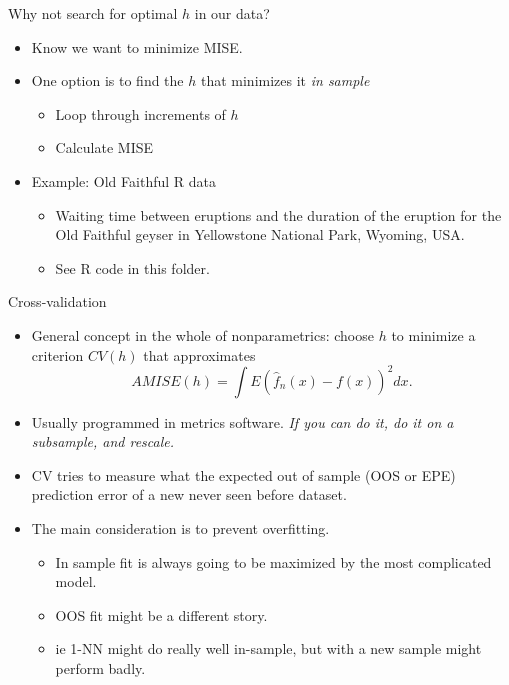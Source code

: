 \begin{frame}{Why not search for optimal $h$ in our data?}
  \begin{itemize}
  \item Know we want to minimize MISE. 
  \item One option is to find the $h$ that minimizes it \textit{in sample}
  \begin{itemize}
    \item Loop through increments of $h$
    \item Calculate MISE
  \end{itemize}
  \item Example: Old Faithful R data
  \begin{itemize}
    \item Waiting time between eruptions and the duration of the eruption for the Old Faithful geyser in Yellowstone National Park, Wyoming, USA.
    \item See R code in this folder.
  \end{itemize}
  \end{itemize}
\end{frame}

\begin{frame}{Cross-validation}
  \begin{itemize}
  \item General concept in the whole of nonparametrics: choose $h$ to minimize a criterion $CV(h)$ that approximates
  $$ AMISE(h)=\int E(\hat{f}_n(x)-f(x))^2dx.$$
  \item Usually programmed in metrics software. \emph{If you can do it, do it on a subsample, and rescale.}
  \item CV tries to measure what the expected out of sample (OOS or EPE) prediction error of a new never seen before dataset.
  \item The main consideration is to prevent \alert{overfitting}.
  \begin{itemize}
  \item In sample fit is always going to be maximized by the most complicated model.
  \item OOS fit might be a different story.
  \item ie 1-NN might do really well in-sample, but with a new sample might perform badly.
  \end{itemize}
  \end{itemize}
\end{frame}
  
